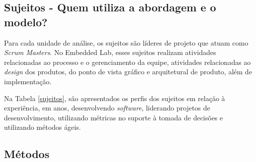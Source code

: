 \begin{longtable}
\end{longtable}

\subsection{Sujeitos - Quem utiliza a abordagem e o modelo?}
\label{estudodecaso:design:sujeitos}

Para cada unidade de análise, os sujeitos são líderes de projeto que atuam como \textit{Scrum Masters}. No Embedded Lab, esses sujeitos realizam atividades relacionadas ao processo e o gerenciamento da equipe, atividades relacionadas ao \textit{design} dos produtos, do ponto de vista gráfico e arquitetural de produto, além de implementação.

Na Tabela \ref{sujeitos}, são apresentados os perfis dos sujeitos em relação à experiência, em anos, desenvolvendo \textit{software}, liderando projetos de desenvolvimento, utilizando métricas no suporte à tomada de decisões e utilizando métodos ágeis.

\begin{table}[ht!]
\centering
\caption{Perfis dos Sujeitos.}
\label{sujeitos}
\end{table}

\subsection{Métodos}
\label{estudodecaso:design:metodos}

